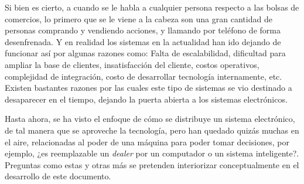 Si bien es cierto, a cuando se le habla a cualquier persona respecto a las bolsas de comercios, lo primero que se le viene a la cabeza son una gran cantidad de 
personas comprando y vendiendo acciones, y llamando por teléfono de forma desenfrenada. Y en realidad los sistemas en la actualidad han ido dejando de funcionar así 
por algunas razones como: Falta de escalabilidad, dificultad para ampliar la base de clientes, insatisfacción del cliente, costos operativos, complejidad de 
integración, costo de desarrollar tecnología internamente, etc. Existen bastantes razones por las cuales este tipo de sistemas se vio destinado a desaparecer en el
tiempo, dejando la puerta abierta a los sistemas electrónicos.

Hasta ahora, se ha visto el enfoque de cómo se distribuye un sistema electrónico, de tal manera que se aproveche la tecnología, pero han quedado quizás muchas en
el aire, relacionadas al poder de una máquina para poder tomar decisiones, por ejemplo, ¿es reemplazable un \emph{dealer} por un computador o un sistema inteligente?.
Preguntas como estas y otras más se pretenden interiorizar conceptualmente en el desarrollo de este documento.
